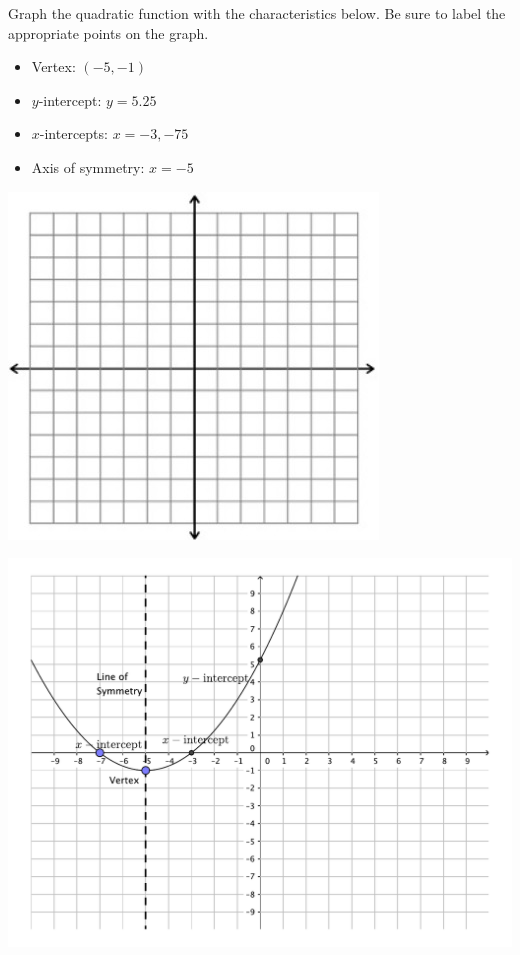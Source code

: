 {
	Graph the quadratic function with the characteristics below.  Be sure to label the appropriate points on the graph.
	\begin{itemize}
	\item	Vertex: $(-5,-1)$  
	\item $y$-intercept: $y=5.25$ 
	\item $x$-intercepts: $x=-3,-75$
	\item Axis of symmetry: $x=-5$
	\end{itemize}
	\begin{onlyproblem}\begin{center}\includegraphics{fig-graphpaper.png}\end{center}\end{onlyproblem} \begin{onlysolution}\begin{center}\includegraphics{fig100-18_5-c-answer}\end{center}\end{onlysolution}}
